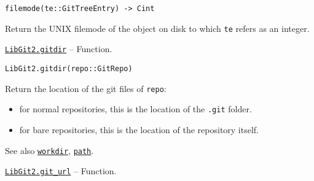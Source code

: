 \begin{adjustwidth}{2em}{0pt}


\begin{verbatim}
filemode(te::GitTreeEntry) -> Cint
\end{verbatim}

Return the UNIX filemode of the object on disk to which \texttt{te} refers as an integer.



\end{adjustwidth}
\hypertarget{12125979754140967861}{}
\hyperlink{12125979754140967861}{\texttt{LibGit2.gitdir}}  -- {Function.}

\begin{adjustwidth}{2em}{0pt}


\begin{verbatim}
LibGit2.gitdir(repo::GitRepo)
\end{verbatim}

Return the location of the {\textquotedbl}git{\textquotedbl} files of \texttt{repo}:

\begin{itemize}
\item for normal repositories, this is the location of the \texttt{.git} folder.


\item for bare repositories, this is the location of the repository itself.

\end{itemize}
See also \hyperlink{6689577338311178757}{\texttt{workdir}}, \hyperlink{7655803558162329563}{\texttt{path}}.



\end{adjustwidth}
\hypertarget{12071312184635750746}{}
\hyperlink{12071312184635750746}{\texttt{LibGit2.git\_url}}  -- {Function.}

